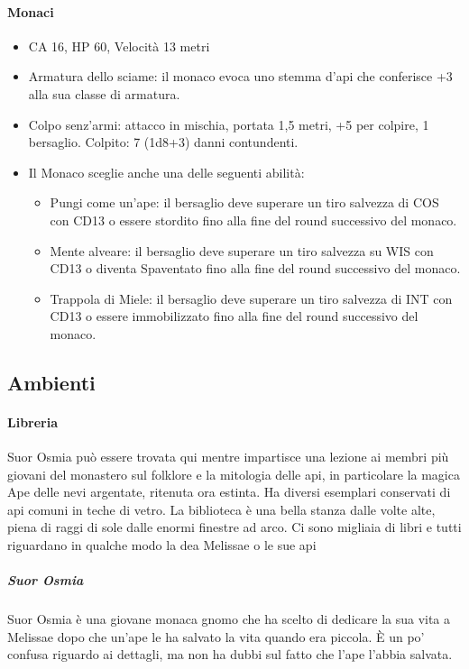 \documentclass{article}
\begin{document}
\paragraph{Monaci}
\begin{itemize}
    \item CA 16, HP 60, Velocità 13 metri
    \item Armatura dello sciame: il monaco evoca uno stemma d'api che conferisce +3 alla sua classe di armatura.
    \item Colpo senz'armi: attacco in mischia, portata 1,5 metri, +5 per colpire, 1 bersaglio. Colpito: 7 (1d8+3) danni contundenti.
    \item Il Monaco sceglie anche una delle seguenti abilità:
    \begin{itemize}
        \item Pungi come un'ape: il bersaglio deve superare un tiro salvezza di COS con CD13 o essere stordito fino alla fine del round successivo del monaco.
        \item Mente alveare: il bersaglio deve superare un tiro salvezza su WIS con CD13 o diventa Spaventato fino alla fine del round successivo del monaco.
        \item Trappola di Miele: il bersaglio deve superare un tiro salvezza di INT con CD13 o essere immobilizzato fino alla fine del round successivo del monaco.
    \end{itemize}
\end{itemize}

\subsection{Ambienti}
    \paragraph{Libreria}
    Suor Osmia può essere trovata qui mentre impartisce una lezione ai membri più giovani del monastero sul folklore e la mitologia delle api, in particolare la magica Ape delle nevi argentate, ritenuta ora estinta. Ha diversi esemplari conservati di api comuni in teche di vetro.
La biblioteca è una bella stanza dalle volte alte, piena di raggi di sole dalle enormi finestre ad arco. Ci sono migliaia di libri e tutti riguardano in qualche modo la dea Melissae o le sue api
    \subparagraph{Suor Osmia}Suor Osmia è una giovane monaca gnomo che ha scelto di dedicare la sua vita a Melissae dopo che un'ape le ha salvato la vita quando era piccola. È un po' confusa riguardo ai dettagli, ma non ha dubbi sul fatto che l'ape l'abbia salvata.
\end{document}
